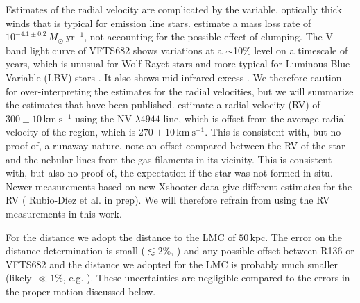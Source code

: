 \documentclass[apjl,twocolumn]{emulateapj}
\newcommand{\SdM}[1]{{{\color{brown}{#1}}}}
\newcommand{\kms}{{\,\mathrm{km\ s^{-1}}}}
\newcommand{\Msun}{{\,\mathrm{M}_\odot}}
\begin{document}
Estimates of the radial velocity are complicated by the variable, optically thick winds that is typical for emission line stars. \citet{bestenlehner:11} estimate a mass loss rate of $10^{-4.1\pm0.2}\,M_\odot \ \mathrm{yr}^{-1}$, not accounting for the possible effect of clumping.  The V-band light curve of VFTS682  shows variations at a $\sim$10\% level on a timescale of years, which is unusual for Wolf-Rayet stars and more typical for Luminous Blue Variable (LBV) stars \citep{udalski:08, bestenlehner:11}. It also shows mid-infrared excess \citep{gruendl:09}.  We therefore caution for over-interpreting the estimates for the radial velocities, but we will summarize the estimates that have been published.  \citet{bestenlehner:11}  estimate a radial velocity (RV) of  $300\pm10\kms$ using the  N{\footnotesize V} $\lambda4944$ line, which is offset from the average radial velocity of the region, which is  $270\pm10\kms$. This is consistent with, but no proof of, a runaway nature.  \cite{bressert:12} note an offset compared between the RV of the star and the nebular lines from the gas filaments in its vicinity. This is consistent with, but also no proof of, the expectation if the star was not formed in situ.  Newer measurements based on new Xshooter data give different estimates for the RV ({\color{blue} Rubio-D{\' i}ez et al. in prep}). We will therefore refrain from using the RV measurements in this work. 




For the distance we adopt the distance to the LMC of $50$\,kpc. The error on the distance determination is small ($\lesssim2\%$, \citealt{pietrzynski:13}) and any possible offset between  R136 or VFTS682  and the distance we adopted for the LMC is probably much smaller (likely $\ll 1\%$, e.g. \citealt{Luks+1992}). These uncertainties are negligible compared to the errors in the proper motion discussed below.  


\end{document}
